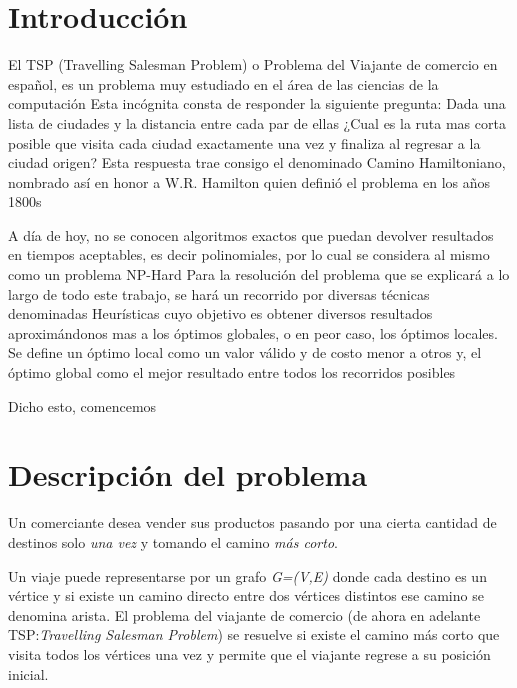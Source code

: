 \documentclass[10pt,a4paper]{article}
\begin{document}


\maketitle

\section{Introducción} \label{sec:Intro}
El TSP (Travelling Salesman Problem) o Problema del Viajante de comercio en español, es un problema muy estudiado en el área de las ciencias de la computación
Esta incógnita consta de responder la siguiente pregunta:
Dada una lista de ciudades y la distancia entre cada par de ellas ¿Cual es la ruta mas corta posible que visita cada ciudad exactamente una vez y finaliza al regresar a la ciudad origen?
Esta respuesta trae consigo el denominado Camino Hamiltoniano, nombrado así en honor a W.R. Hamilton quien definió el problema en los años 1800s

A día de hoy, no se conocen algoritmos exactos que puedan devolver resultados en tiempos aceptables, es decir polinomiales, por lo cual se considera al mismo como un problema NP-Hard
Para la resolución del problema que se explicará a lo largo de todo este trabajo, se hará un recorrido por diversas técnicas denominadas Heurísticas cuyo objetivo es obtener diversos resultados aproximándonos mas a los óptimos globales, o en peor caso, los óptimos locales. Se define un óptimo local como un valor válido y de costo menor a otros y, el óptimo global como el mejor resultado entre todos los recorridos posibles

Dicho esto, comencemos

\section{Descripción del problema}
Un comerciante desea vender sus productos pasando por una cierta cantidad de destinos solo \textit{una vez} y tomando el camino \textit{más corto}.

Un viaje puede representarse por un grafo \textit{G=(V,E)} donde cada destino es un vértice y si existe un camino directo entre dos vértices distintos ese camino se denomina arista. El problema del viajante de comercio (de ahora en adelante TSP:\textit{Travelling Salesman Problem}) se resuelve si existe el camino más corto que visita todos los vértices una vez y permite que el viajante regrese a su posición inicial.
\end{document}
